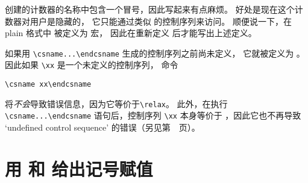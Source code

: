 \documentclass{book}
\begin{document}
 创建的计数器的名称中包含一个冒号，因此写起来有点麻烦。
好处是现在这个计数器对用户是隐藏的，
它只能通过类似  的控制序列来访问。
顺便说一下，在 plain 格式中  被定义为  宏，
因此在重新定义  后才能写出上述定义。

如果用 \verb>\csname...\endcsname> 生成的控制序列之前尚未定义，
它就被定义为 。因此如果 \verb=\xx= 是一个未定义的控制序列，
命令
\begin{verbatim}
\csname xx\endcsname
\end{verbatim}
将{\em 不会}导致错误信息，因为它等价于\verb=\relax=。
此外，在执行 \verb-\csname...\endcsname- 语句后，控制序列
\verb=\xx= 本身等价于 ，因此它也不再导致
`undefined control sequence' 的错误（另见第~\pageref{relax:cs}~页）。


\section{用 \protect{} 和 \protect{} 给出记号赋值}
\end{document}
